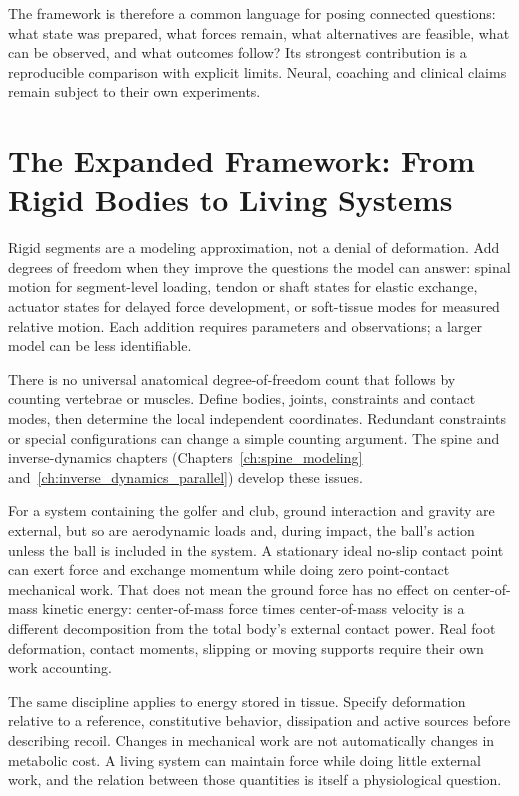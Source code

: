The framework is therefore a common language for posing connected questions: what state was prepared, what forces remain, what alternatives are feasible, what can be observed, and what outcomes follow? Its strongest contribution is a reproducible comparison with explicit limits. Neural, coaching and clinical claims remain subject to their own experiments.

\section{The Expanded Framework: From Rigid Bodies to Living Systems}

Rigid segments are a modeling approximation, not a denial of deformation. Add degrees of freedom when they improve the questions the model can answer: spinal motion for segment-level loading, tendon or shaft states for elastic exchange, actuator states for delayed force development, or soft-tissue modes for measured relative motion. Each addition requires parameters and observations; a larger model can be less identifiable.

There is no universal anatomical degree-of-freedom count that follows by counting vertebrae or muscles. Define bodies, joints, constraints and contact modes, then determine the local independent coordinates. Redundant constraints or special configurations can change a simple counting argument. The spine and inverse-dynamics chapters (Chapters~\ref{ch:spine_modeling} and~\ref{ch:inverse_dynamics_parallel}) develop these issues.

For a system containing the golfer and club, ground interaction and gravity are external, but so are aerodynamic loads and, during impact, the ball's action unless the ball is included in the system. A stationary ideal no-slip contact point can exert force and exchange momentum while doing zero point-contact mechanical work. That does not mean the ground force has no effect on center-of-mass kinetic energy: center-of-mass force times center-of-mass velocity is a different decomposition from the total body's external contact power. Real foot deformation, contact moments, slipping or moving supports require their own work accounting.

The same discipline applies to energy stored in tissue. Specify deformation relative to a reference, constitutive behavior, dissipation and active sources before describing recoil. Changes in mechanical work are not automatically changes in metabolic cost. A living system can maintain force while doing little external work, and the relation between those quantities is itself a physiological question.

